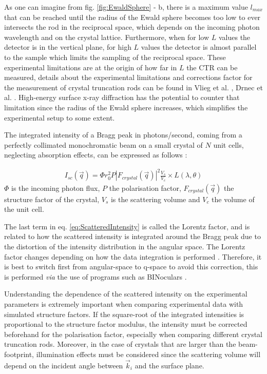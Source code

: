 As one can imagine from fig. \ref{fig:EwaldSphere} - b, there is a maximum value $l_{max}$ that can be reached until the radius of the Ewald sphere becomes too low to ever intersects the rod in the reciprocal space, which depends on the incoming photon wavelength and on the crystal lattice.
Furthermore, when for low $L$ values the detector is in the vertical plane, for high $L$ values the detector is almost parallel to the sample which limits the sampling of the reciprocal space.
These experimental limitations are at the origin of how far in $L$ the CTR can be measured, details about the experimental limitations and corrections factor for the measurement of crystal truncation rods can be found in Vlieg et al. \parencite*{Vlieg1997}, Drnec et al. \parencite*{Drnec2014}.
High-energy surface x-ray diffraction \parencite{Gustafson2014, Harlow2020, Hejral2021} has the potential to counter that limitation since the radius of the Ewald sphere increases, which simplifies the experimental setup to some extent.

The integrated intensity of a Bragg peak in photons/second, coming from a perfectly collimated monochromatic beam on a small crystal of $N$ unit cells, neglecting absorption effects, can be expressed as follows \parencite{NielsenMcMorrow}:

\begin{gather}
    \label{eq:ScatteredIntensity}
    I_{sc}(\vec{q}) = \Phi r_0^2 P |F_{crystal}(\vec{q})|^2 \frac{V_s}{V_c} \times L(\lambda, \theta)
\end{gather}
$\Phi$ is the incoming photon flux, $P$ the polarisation factor, $F_{crystal}(\vec{q})$ the structure factor of the crystal, $V_s$ is the scattering volume and $V_c$ the volume of the unit cell.

The last term in eq. \ref{eq:ScatteredIntensity} is called the Lorentz factor, and is related to how the scattered intensity is integrated around the Bragg peak due to the distortion of the intensity distribution in the angular space.
The Lorentz factor changes depending on how the data integration is performed \parencite{Robach2000, Drnec2014}.
Therefore, it is best to switch first from angular-space to q-space to avoid this correction, this is performed \textit{via} the use of programs such as BINoculars \parencite{Roobol2015}.

Understanding the dependence of the scattered intensity on the experimental parameters is extremely important when comparing experimental data with simulated structure factors.
If the square-root of the integrated intensities is proportional to the structure factor modulus, the intensity must be corrected beforehand for the polarisation factor, especially when comparing different crystal truncation rods.
Moreover, in the case of crystals that are larger than the beam-footprint, illumination effects must be considered since the scattering volume will depend on the incident angle between $\vec{k}_i$ and the surface plane.

